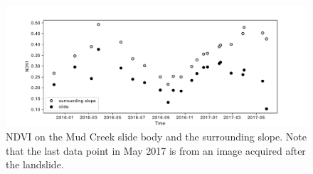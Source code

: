 \documentclass[journal abbreviation, manuscript]{copernicus}
\begin{document}
\begin{figure}[hbt!]
    \centering
    \includegraphics[scale = 0.5]{NDVI_noratio.pdf}
    \caption{NDVI on the Mud Creek slide body and the surrounding slope. Note that the last data point in May 2017 is from an image acquired after the landslide.}
    \label{fig:ndvi_noratio}
\end{figure}
\end{document}
